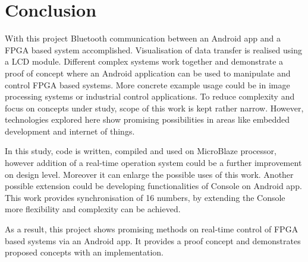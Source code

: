 \chapter{Conclusion}

With this project Bluetooth communication between an Android app and a FPGA based system accomplished. Visualisation of data transfer is realised using a LCD module. Different complex systems work together and demonstrate a proof of concept where an Android application can be used to manipulate and control FPGA based systems. More concrete example usage could be in image processing systems or industrial control applications. To reduce complexity and focus on concepts under study, scope of this work is kept rather narrow. However, technologies explored here show promising possibilities in areas like embedded development and internet of things.

In this study, code is written, compiled and used on MicroBlaze processor, however addition of a real-time operation system could be a further improvement on design level. Moreover it can enlarge the possible uses of this work. Another  possible extension could be developing functionalities of Console on Android app. This work provides synchronisation of 16 numbers, by extending the Console more flexibility and complexity can be achieved. 

As a result, this project shows promising methods on real-time control of FPGA based systems via an Android app. It provides a proof concept and demonstrates proposed concepts with an implementation. 
